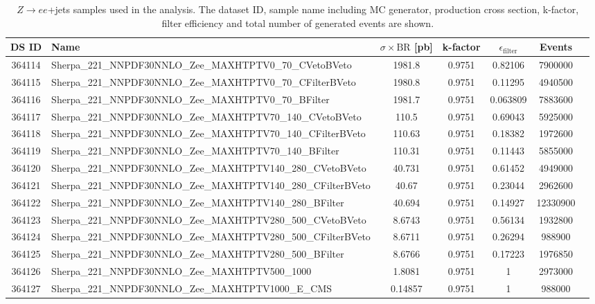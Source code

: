 \begin{landscape}
\begin{table}[!htb]
\caption[$Z\to ee +$ jets Monte Carlo samples for background estimation]{$Z \to ee$+jets samples used in the analysis. The dataset ID, sample name including MC generator, production cross section, k-factor, filter efficiency and total number of generated events are shown.}
\label{tabular:mc_samples_Zeejets}
\begin{footnotesize}
\begin{center}
\begin{tabular}{c|l|c|c|c|cr}
	\hline\hline
	DS ID & Name & $\sigma\times\text{BR}$ [pb] & k-factor & $\epsilon_{\text{filter}}$ & Events \\ \hline\hline
364114 & Sherpa\_221\_NNPDF30NNLO\_Zee\_MAXHTPTV0\_70\_CVetoBVeto & 1981.8 & 0.9751 & 0.82106 & 7900000 \\
364115 & Sherpa\_221\_NNPDF30NNLO\_Zee\_MAXHTPTV0\_70\_CFilterBVeto & 1980.8 & 0.9751 & 0.11295 & 4940500 \\
364116 & Sherpa\_221\_NNPDF30NNLO\_Zee\_MAXHTPTV0\_70\_BFilter & 1981.7 & 0.9751 & 0.063809 & 7883600 \\
364117 & Sherpa\_221\_NNPDF30NNLO\_Zee\_MAXHTPTV70\_140\_CVetoBVeto & 110.5 & 0.9751 & 0.69043 & 5925000 \\
364118 & Sherpa\_221\_NNPDF30NNLO\_Zee\_MAXHTPTV70\_140\_CFilterBVeto & 110.63 & 0.9751 & 0.18382 & 1972600 \\
364119 & Sherpa\_221\_NNPDF30NNLO\_Zee\_MAXHTPTV70\_140\_BFilter & 110.31 & 0.9751 & 0.11443 & 5855000 \\
364120 & Sherpa\_221\_NNPDF30NNLO\_Zee\_MAXHTPTV140\_280\_CVetoBVeto & 40.731 & 0.9751 & 0.61452 & 4949000 \\
364121 & Sherpa\_221\_NNPDF30NNLO\_Zee\_MAXHTPTV140\_280\_CFilterBVeto & 40.67 & 0.9751 & 0.23044 & 2962600 \\
364122 & Sherpa\_221\_NNPDF30NNLO\_Zee\_MAXHTPTV140\_280\_BFilter & 40.694 & 0.9751 & 0.14927 & 12330900 \\
364123 & Sherpa\_221\_NNPDF30NNLO\_Zee\_MAXHTPTV280\_500\_CVetoBVeto & 8.6743 & 0.9751 & 0.56134 & 1932800 \\
364124 & Sherpa\_221\_NNPDF30NNLO\_Zee\_MAXHTPTV280\_500\_CFilterBVeto & 8.6711 & 0.9751 & 0.26294 & 988900 \\
364125 & Sherpa\_221\_NNPDF30NNLO\_Zee\_MAXHTPTV280\_500\_BFilter & 8.6766 & 0.9751 & 0.17223 & 1976850 \\
364126 & Sherpa\_221\_NNPDF30NNLO\_Zee\_MAXHTPTV500\_1000 & 1.8081 & 0.9751 & 1 & 2973000 \\
364127 & Sherpa\_221\_NNPDF30NNLO\_Zee\_MAXHTPTV1000\_E\_CMS & 0.14857 & 0.9751 & 1 & 988000 \\
	\hline\hline
\end{tabular}
\end{center}
\end{footnotesize}
\end{table}


\end{landscape}
